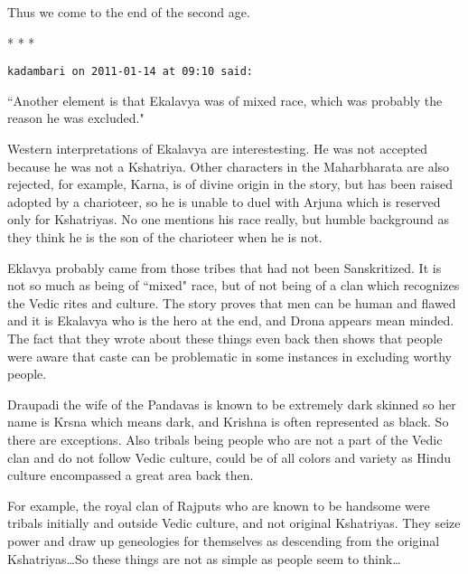 Thus we come to the end of the second age.




\begin{center}* * *\end{center}

\begin{footnotesize}\begin{sffamily}



\texttt{kadambari on 2011-01-14 at 09:10 said: }

``Another element is that Ekalavya was of mixed race, which was probably the reason he was excluded."

Western interpretations of Ekalavya are interestesting. He was not accepted because he was not a Kshatriya. Other characters in the Maharbharata are also rejected, for example, Karna, is of divine origin in the story, but has been raised adopted by a charioteer, so he is unable to duel with Arjuna which is reserved only for Kshatriyas. No one mentions his race really, but humble background as they think he is the son of the charioteer when he is not.

Eklavya probably came from those tribes that had not been Sanskritized. It is not so much as being of ``mixed" race, but of not being of a clan which recognizes the Vedic rites and culture. The story proves that men can be human and flawed and it is Ekalavya who is the hero at the end, and Drona appears mean minded. The fact that they wrote about these things even back then shows that people were aware that caste can be problematic in some instances in excluding worthy people.

Draupadi the wife of the Pandavas is known to be extremely dark skinned so her name is Krsna which means dark, and Krishna is often represented as black. So there are exceptions. Also tribals being people who are not a part of the Vedic clan and do not follow Vedic culture, could be of all colors and variety as Hindu culture encompassed a great area back then.

For example, the royal clan of Rajputs who are known to be handsome were tribals initially and outside Vedic culture, and not original Kshatriyas. They seize power and draw up geneologies for themselves as descending from the original Kshatriyas…So these things are not as simple as people seem to think…


\hfill


\end{sffamily}
\end{footnotesize}

